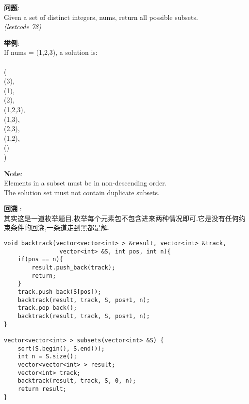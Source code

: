     
\begin{description}
    \item{\textbf{问题}}:\\
Given a set of distinct integers, nums, return all possible subsets.\\
\textit{(leetcode 78)}
	\item{\textbf{举例}}:\\
If nums = (1,2,3), a solution is:\\
\\
(\\
  (3),\\
  (1),\\
  (2),\\
  (1,2,3),\\
  (1,3),\\
  (2,3),\\
  (1,2),\\
  ()\\
)
	\item{\textbf{Note}}:\\
Elements in a subset must be in non-descending order.\\
The solution set must not contain duplicate subsets.\\
    \item{\textbf{回溯}} : 
    \\其实这是一道枚举题目,枚举每个元素包不包含进来两种情况即可.它是没有任何约束条件的回溯,一条道走到黑都是解.
    \begin{lstlisting}
void backtrack(vector<vector<int> > &result, vector<int> &track,
				vector<int> &S, int pos, int n){
	if(pos == n){
		result.push_back(track);
		return;
	}
	track.push_back(S[pos]);
	backtrack(result, track, S, pos+1, n);
	track.pop_back();
	backtrack(result, track, S, pos+1, n);
}

vector<vector<int> > subsets(vector<int> &S) {
	sort(S.begin(), S.end());
	int n = S.size();
	vector<vector<int> > result;
	vector<int> track;
	backtrack(result, track, S, 0, n);
	return result;
}
    \end{lstlisting}
\end{description}
